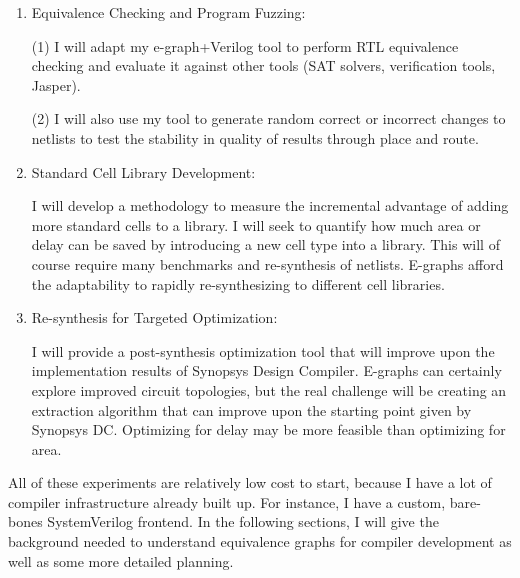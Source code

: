 \documentclass[10pt,letterpaper]{article}
\begin{document}
\begin{enumerate}
    \item Equivalence Checking and Program Fuzzing:

          \hspace{2em}\begin{minipage}{0.8\linewidth}
              (1) I will adapt my e-graph+Verilog tool to perform RTL equivalence checking and evaluate it against other tools (SAT solvers, verification tools, Jasper).

              (2) I will also use my tool to generate random correct or incorrect changes to netlists to test the stability in quality of results through place and route.
          \end{minipage}

    \item Standard Cell Library Development:

          \hspace{2em}\begin{minipage}{0.8\linewidth}
              I will develop a methodology to measure the incremental advantage of adding more standard cells to a library.
              I will seek to quantify how much area or delay can be saved by introducing a new cell type into a library. This will of course require many benchmarks and re-synthesis of netlists.
              E-graphs afford the adaptability to rapidly re-synthesizing to different cell libraries.
          \end{minipage}

    \item Re-synthesis for Targeted Optimization:

          \hspace{2em}\begin{minipage}{0.8\linewidth}
              I will provide a post-synthesis optimization tool that will improve upon the implementation results of Synopsys Design Compiler.
              E-graphs can certainly explore improved circuit topologies, but the real challenge will be creating an extraction algorithm that can improve upon the starting point given by Synopsys DC.
              Optimizing for delay may be more feasible than optimizing for area.
          \end{minipage}
\end{enumerate}

All of these experiments are relatively low cost to start, because I have a lot
of compiler infrastructure already built up. For instance, I have a custom,
bare-bones SystemVerilog frontend. In the following sections, I will give the
background needed to understand equivalence graphs for compiler development as
well as some more detailed planning.
\end{document}
